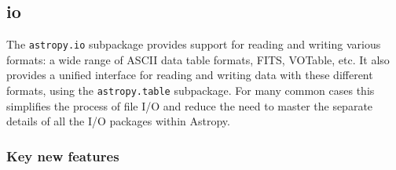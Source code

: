 \documentclass[modern]{aastex61}
\newcommand{\package}[1]{\texttt{#1}\xspace}
\newcommand{\inlinecomment}[2]{\todo[inline]{#1: #2}\xspace}
\begin{document}

\subsection{io}

The \package{astropy.io} subpackage provides support for reading and writing
various formats: a wide range of ASCII data table formats, FITS, VOTable, etc.
It also provides a unified interface for reading and writing data with these
different formats, using the \package{astropy.table} subpackage.
For many common cases this simplifies the process of file I/O and reduce the
need to master the separate details of all the I/O packages within Astropy.




\subsubsection{Key new features}
\end{document}
